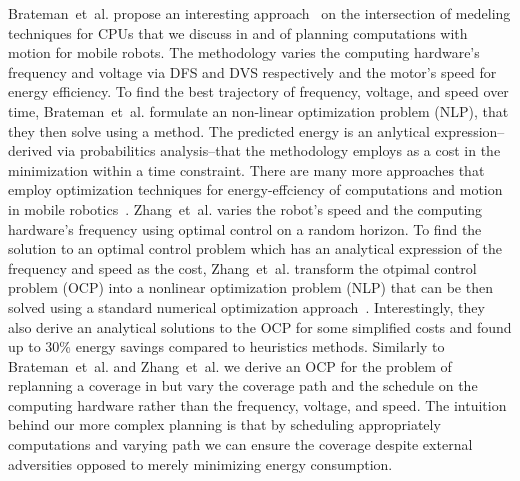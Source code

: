 Brateman~et~al. propose an interesting approach~\citep{brateman2006energy} on the intersection of medeling techniques for CPUs that we discuss in  and of planning computations with motion for mobile robots. The methodology varies the computing hardware's frequency and voltage via DFS and DVS respectively and the motor's speed for energy efficiency. To find the best trajectory of frequency, voltage, and speed over time, Brateman~et~al. formulate an non-linear optimization problem (NLP), that they then solve using a  method. The predicted energy is an anlytical expression--derived via probabilitics analysis--that the methodology employs as a cost in the minimization within a time constraint. 
There are many more approaches that employ optimization techniques for energy-effciency of computations and motion in mobile robotics~\citep{zhang2007low,ondruska2015scheduled,lahijanian2018resource}. Zhang~et~al. varies the robot's speed and the computing hardware's frequency using optimal control on a random horizon. To find the solution to an optimal control problem which has an analytical expression of the frequency and speed as the cost, Zhang~et~al. transform the otpimal control problem (OCP) into a nonlinear optimization problem (NLP) that can be then solved using a standard numerical optimization approach~\citep{}. Interestingly, they also derive an analytical solutions to the OCP for some simplified costs and found up to 30\% energy savings compared to heuristics methods. Similarly to Brateman~et~al. and Zhang~et~al. we derive an OCP for the problem of replanning a coverage in  but vary the coverage path and the schedule on the computing hardware rather than the frequency, voltage, and speed. The intuition behind our more complex planning is that by scheduling appropriately computations and varying path we can ensure the coverage despite external adversities opposed to merely minimizing energy consumption.

